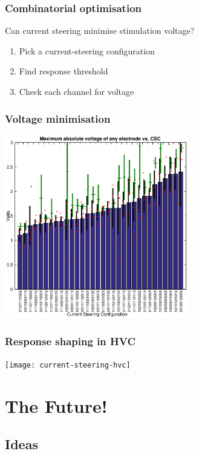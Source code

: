 \documentclass{beamer}
\begin{document}
\begin{frame}
  \frametitle{Combinatorial optimisation}
  Can current steering minimise stimulation voltage?
  \begin{enumerate}
  \item Pick a current-steering configuration
  \item Find response threshold
  \item Check each channel for voltage
  \end{enumerate}
\end{frame}


\begin{frame}
  \frametitle{Voltage minimisation}
  \begin{center}
    \includegraphics[width=8cm]{VoltageVsCSC}
  \end{center}
\end{frame}




\begin{frame}
  \frametitle{Response shaping in HVC}
  \begin{center}
    \texttt{[image: current-steering-hvc]}
  \end{center}
\end{frame}





\section{The Future!}
\subsection{Ideas}
\end{document}
